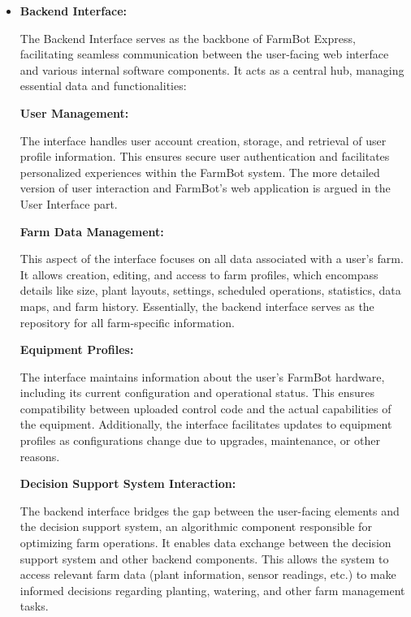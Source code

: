 \begin{itemize}
    \item \textbf{Backend Interface:}
    
    The Backend Interface serves as the backbone of FarmBot Express, facilitating seamless communication between the user-facing web interface and various internal software components. It acts as a central hub, managing essential data and functionalities:

    \textbf{User Management:}
    
    The interface handles user account creation, storage, and retrieval of user profile information. This ensures secure user authentication and facilitates personalized experiences within the FarmBot system. The more detailed version of user interaction and FarmBot's web application is argued in the User Interface part.
    
    \textbf{Farm Data Management:}
    
    This aspect of the interface focuses on all data associated with a user's farm. It allows creation, editing, and access to farm profiles, which encompass details like size, plant layouts, settings, scheduled operations, statistics, data maps, and farm history. Essentially, the backend interface serves as the repository for all farm-specific information.
    
    \textbf{Equipment Profiles:}
    
    The interface maintains information about the user's FarmBot hardware, including its current configuration and operational status. This ensures compatibility between uploaded control code and the actual capabilities of the equipment. Additionally, the interface facilitates updates to equipment profiles as configurations change due to upgrades, maintenance, or other reasons.
    
    \textbf{Decision Support System Interaction:}
    
    The backend interface bridges the gap between the user-facing elements and the decision support system, an algorithmic component responsible for optimizing farm operations. It enables data exchange between the decision support system and other backend components. This allows the system to access relevant farm data (plant information, sensor readings, etc.) to make informed decisions regarding planting, watering, and other farm management tasks.


\end{itemize}
